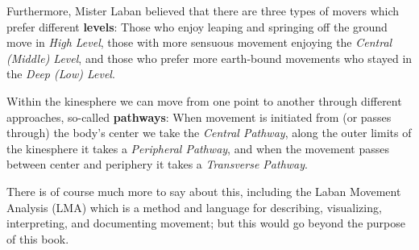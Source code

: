 Furthermore, Mister Laban believed that there are three types of movers which prefer different \textbf{levels}: Those who enjoy leaping and springing off the ground move in \textit{High Level}, those with more sensuous movement enjoying the \textit{Central (Middle) Level}, and those who prefer more earth-bound movements who stayed in the \textit{Deep (Low) Level}.

Within the kinesphere we can move from one point to another through different approaches, so-called \textbf{pathways}: When movement is initiated from (or passes through) the body's center we take the \textit{Central Pathway}, along the outer limits of the kinesphere it takes a \textit{Peripheral Pathway}, and when the movement passes between center and periphery it takes a \textit{Transverse Pathway}.

There is of course much more to say about this, including the Laban Movement Analysis (LMA) which is a method and language for describing, visualizing, interpreting, and documenting movement; but this would go beyond the purpose of this book.
